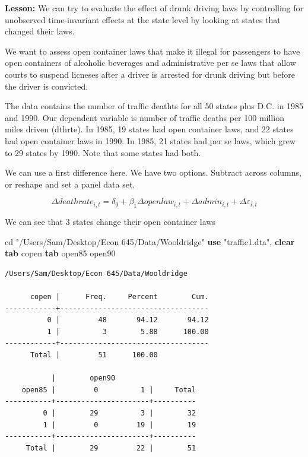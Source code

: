 \documentclass[
]{book}
\newenvironment{Shaded}{\begin{snugshade}}{\end{snugshade}}
\newcommand{\KeywordTok}[1]{\textcolor[rgb]{0.13,0.29,0.53}{\textbf{#1}}}
\newcommand{\NormalTok}[1]{#1}
\newcommand{\StringTok}[1]{\textcolor[rgb]{0.31,0.60,0.02}{#1}}
\begin{document}
\textbf{Lesson:} We can try to evaluate the effect of drunk driving laws by controlling for unobserved time-invariant effects at the state level by looking at states that changed their laws.

We want to assess open container laws that make it illegal for passengers to have open containers of alcoholic beverages and administrative per se laws that allow courts to suspend licneses after a driver is arrested for drunk driving but before the driver is convicted.

The data contains the number of traffic deathts for all 50 states plus D.C. in 1985 and 1990. Our dependent variable is number of traffic deaths per 100 million miles driven (dthrte). In 1985, 19 states had open container laws, and 22 states had open container laws in 1990. In 1985, 21 states
had per se laws, which grew to 29 states by 1990. Note that some states had both.

We can use a first difference here. We have two options. Subtract across columns, or reshape and set a panel data set.

\[ \Delta deathrate_{i,t} = \delta_0 + \beta_1 \Delta openlaw_{i,t} + \Delta admin_{i,t} + \Delta \varepsilon_{i,t} \]

We can see that 3 states change their open container laws

\begin{Shaded}
\begin{Highlighting}[]
\NormalTok{cd }\StringTok{"/Users/Sam/Desktop/Econ 645/Data/Wooldridge"}
\KeywordTok{use} \StringTok{"traffic1.dta"}\NormalTok{, }\KeywordTok{clear}
\KeywordTok{tab}\NormalTok{ copen}
\KeywordTok{tab}\NormalTok{ open85 open90}
\end{Highlighting}
\end{Shaded}

\begin{verbatim}
/Users/Sam/Desktop/Econ 645/Data/Wooldridge

      copen |      Freq.     Percent        Cum.
------------+-----------------------------------
          0 |         48       94.12       94.12
          1 |          3        5.88      100.00
------------+-----------------------------------
      Total |         51      100.00

           |        open90
    open85 |         0          1 |     Total
-----------+----------------------+----------
         0 |        29          3 |        32 
         1 |         0         19 |        19 
-----------+----------------------+----------
     Total |        29         22 |        51 
\end{verbatim}
\end{document}
